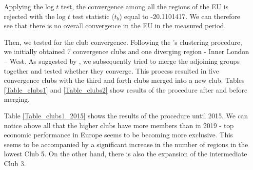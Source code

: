 \documentclass[11pt]{article}
\begin{document}
Applying the log $t$ test, the convergence among all the regions of the EU is rejected with the log $t$ test statistic ($t_b$) equal to -20.1101417. We can therefore see that there is no overall convergence in the EU in the measured period.

Then, we tested for the club convergence. Following the \citeauthor{phillips2007transition}'s clustering procedure, we initially obtained 7 convergence clubs and one diverging region - Inner London – West. As suggested by \citet{bartkowska2012regional}, we subsequently tried to merge the adjoining groups together and tested whether they converge. This process resulted in five convergence clubs with the third and forth clubs merged into a new club. Tables \ref{Table_clubs1} and \ref{Table_clubs2} show results of the procedure after and before merging.

Table \ref{Table_clubs1_2015} shows the results of the \citeauthor{phillips2007transition} procedure until 2015. We can notice above all that the higher clubs have more members than in 2019 - top economic performance in Europe seems to be becoming more exclusive. This seems to be accompanied by a significant increase in the number of regions in the lowest Club 5. On the other hand, there is also the expansion of the intermediate Club 3.

\begin{table}[!htbp] \centering 
 \caption{Convergence club classification after merging} 
  \label{Table_clubs1} 
\end{table}
\end{document}
